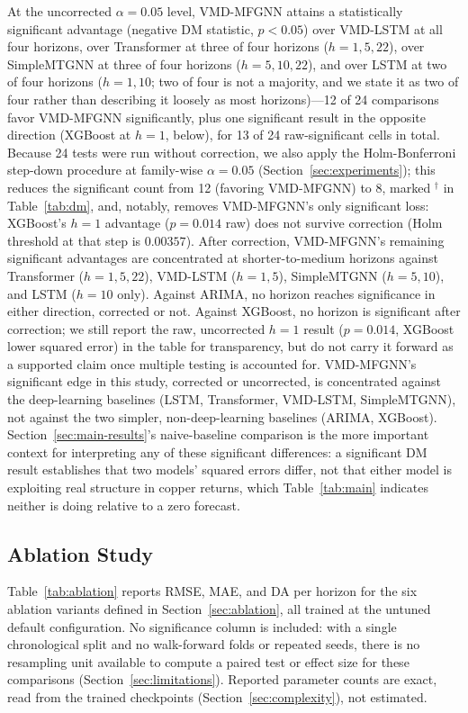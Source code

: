 \documentclass[journal]{IEEEtran}
\begin{document}
At the uncorrected $\alpha=0.05$ level, VMD-MFGNN attains a statistically significant advantage (negative DM statistic, $p<0.05$) over VMD-LSTM at all four horizons, over Transformer at three of four horizons ($h=1,5,22$), over SimpleMTGNN at three of four horizons ($h=5,10,22$), and over LSTM at two of four horizons ($h=1,10$; two of four is not a majority, and we state it as two of four rather than describing it loosely as most horizons)---12 of 24 comparisons favor VMD-MFGNN significantly, plus one significant result in the opposite direction (XGBoost at $h=1$, below), for 13 of 24 raw-significant cells in total. Because 24 tests were run without correction, we also apply the Holm-Bonferroni step-down procedure at family-wise $\alpha=0.05$ (Section~\ref{sec:experiments}); this reduces the significant count from 12 (favoring VMD-MFGNN) to 8, marked $^{\dagger}$ in Table~\ref{tab:dm}, and, notably, removes VMD-MFGNN's only significant loss: XGBoost's $h=1$ advantage ($p=0.014$ raw) does not survive correction (Holm threshold at that step is $0.00357$). After correction, VMD-MFGNN's remaining significant advantages are concentrated at shorter-to-medium horizons against Transformer ($h=1,5,22$), VMD-LSTM ($h=1,5$), SimpleMTGNN ($h=5,10$), and LSTM ($h=10$ only). Against ARIMA, no horizon reaches significance in either direction, corrected or not. Against XGBoost, no horizon is significant after correction; we still report the raw, uncorrected $h=1$ result ($p=0.014$, XGBoost lower squared error) in the table for transparency, but do not carry it forward as a supported claim once multiple testing is accounted for. VMD-MFGNN's significant edge in this study, corrected or uncorrected, is concentrated against the deep-learning baselines (LSTM, Transformer, VMD-LSTM, SimpleMTGNN), not against the two simpler, non-deep-learning baselines (ARIMA, XGBoost). Section~\ref{sec:main-results}'s naive-baseline comparison is the more important context for interpreting any of these significant differences: a significant DM result establishes that two models' squared errors differ, not that either model is exploiting real structure in copper returns, which Table~\ref{tab:main} indicates neither is doing relative to a zero forecast.

\subsection{Ablation Study}
\label{sec:ablation-results}

Table~\ref{tab:ablation} reports RMSE, MAE, and DA per horizon for the six ablation variants defined in Section~\ref{sec:ablation}, all trained at the untuned default configuration. No significance column is included: with a single chronological split and no walk-forward folds or repeated seeds, there is no resampling unit available to compute a paired test or effect size for these comparisons (Section~\ref{sec:limitations}). Reported parameter counts are exact, read from the trained checkpoints (Section~\ref{sec:complexity}), not estimated.
\end{document}
